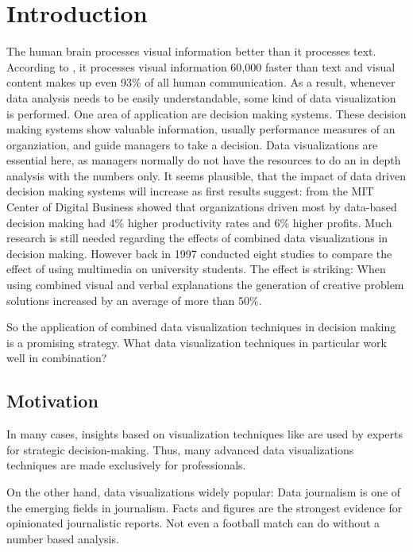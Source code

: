 \documentclass{article}
\begin{document}
\section{Introduction}
The human brain processes visual information better than it processes text.
According to \textcite{Kusinitz2014}, it processes visual information 60,000 faster than text and visual content makes up even 93\% of all human communication.
As a result, whenever data analysis needs to be easily understandable, some kind of data visualization is performed.
One area of application are decision making systems.
These decision making systems show valuable information, usually performance measures of an organziation, and guide managers to take a decision.
Data visualizations are essential here, as managers normally do not have the resources to do an in depth analysis with the numbers only.
It seems plausible, that the impact of data driven decision making systems will increase as first results suggest:
\textcite{McAfee2012} from the MIT Center of Digital Business showed that organizations driven most by data-based decision making had 4\% higher productivity rates and 6\% higher profits.
Much research is still needed regarding the effects of combined data visualizations in decision making.
However back in 1997 \textcite{Mayer1997} conducted eight studies to compare the effect of using multimedia on university students.
The effect is striking: When using combined visual and verbal explanations the generation of creative problem solutions increased by an average of more than 50\%.

So the application of combined data visualization techniques in decision making is a promising strategy.
What data visualization techniques in particular work well in combination?

\subsection{Motivation}


In many cases, insights based on visualization techniques like \cmvs{} are used by experts for strategic decision-making.
Thus, many advanced data visualizations techniques are made exclusively for professionals.

On the other hand, data visualizations widely popular:
Data journalism is one of the emerging fields in journalism.
Facts and figures are the strongest evidence for opinionated journalistic reports.
Not even a football match can do without a number based analysis.
\end{document}
